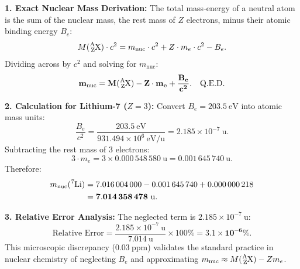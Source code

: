 \begin{solution}
\textbf{1. Exact Nuclear Mass Derivation:}
The total mass-energy of a neutral atom is the sum of the nuclear mass, the rest mass of $Z$ electrons, minus their atomic binding energy $B_e$:
\[
M(\ce{^{A}_{Z}X}) \cdot c^2 = m_{\text{nuc}} \cdot c^2 + Z \cdot m_e \cdot c^2 - B_e.
\]
Dividing across by $c^2$ and solving for $m_{\text{nuc}}$:
\[
\mathbf{m_{\text{nuc}} = M(\ce{^{A}_{Z}X}) - Z \cdot m_e + \frac{B_e}{c^2}}. \quad \text{Q.E.D.}
\]

\textbf{2. Calculation for Lithium-7 ($Z = 3$):}
Convert $B_e = 203.5\ \mathrm{eV}$ into atomic mass units:
\[
\frac{B_e}{c^2} = \frac{203.5\ \mathrm{eV}}{931.494 \times 10^6\ \mathrm{eV/u}} = 2.185 \times 10^{-7}\ \mathrm{u}.
\]
Subtracting the rest mass of 3 electrons:
\[
3 \cdot m_e = 3 \times 0.000\,548\,580\ \mathrm{u} = 0.001\,645\,740\ \mathrm{u}.
\]
Therefore:
\begin{align*}
m_{\text{nuc}}(\ce{^{7}Li}) &= 7.016\,004\,000 - 0.001\,645\,740 + 0.000\,000\,218 \\
                           &= \mathbf{7.014\,358\,478\ \mathrm{u}}.
\end{align*}

\textbf{3. Relative Error Analysis:}
The neglected term is $2.185 \times 10^{-7}\ \mathrm{u}$:
\[
\text{Relative Error} = \frac{2.185 \times 10^{-7}\ \mathrm{u}}{7.014\ \mathrm{u}} \times 100\% = \mathbf{3.1 \times 10^{-6}\%}.
\]
This microscopic discrepancy ($0.03\ \text{ppm}$) validates the standard practice in nuclear chemistry of neglecting $B_e$ and approximating $m_{\text{nuc}} \approx M(\ce{^{A}_{Z}X}) - Z m_e$.
\end{solution}

